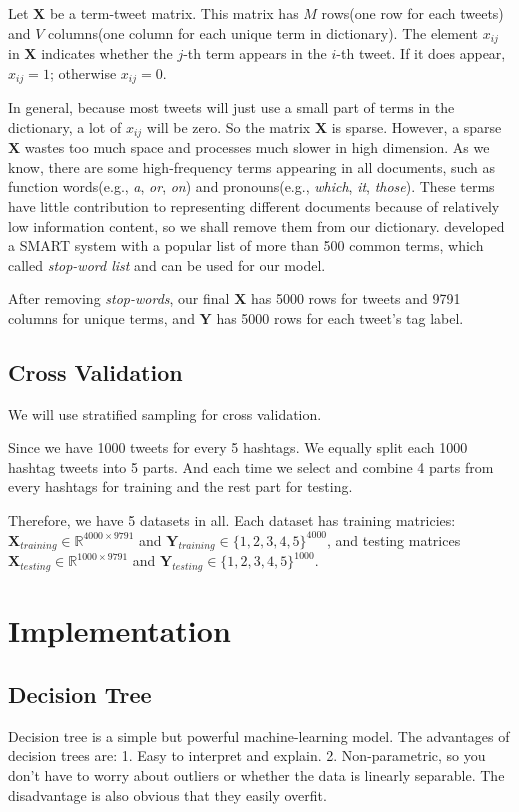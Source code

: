 \documentclass[letterpaper,11pt,twocolumn]{article}
\def\bfY{\mathbf Y}
\def\bfX{\mathbf X}
\def\R{\mathbb R}
\begin{document}
Let $\bfX$ be a term-tweet matrix. This matrix has $M$ rows(one row for each tweets) and $V$ columns(one column for each unique term in dictionary). The element $x_{ij}$ in $\bfX$ indicates whether the $j$-th term appears in the $i$-th tweet. If it does appear, $x_{ij} = 1$; otherwise $x_{ij} = 0$.

In general, because most tweets will just use a small part of terms in the dictionary, a lot of $x_{ij}$ will be zero. So the matrix $\bfX$ is sparse. However, a sparse $\bfX$ wastes too much space and processes much slower in high dimension. As we know, there are some high-frequency terms appearing in all documents, such as function words(e.g., \emph{a}, \emph{or}, \emph{on}) and pronouns(e.g., \emph{which}, \emph{it}, \emph{those}). These terms have little contribution to representing different documents because of relatively low information content, so we shall remove them from our dictionary. \cite{salton1971smart} developed a SMART system with a popular list of more than 500 common terms, which called \emph{stop-word list} and can be used for our model.

After removing \emph{stop-words}, our final $\bfX$ has 5000 rows for tweets and 9791 columns for unique terms, and $\bfY$ has 5000 rows for each tweet's tag label.
\subsection{Cross Validation}
We will use stratified sampling for cross validation.

Since we have 1000 tweets for every 5 hashtags. We equally split each 1000 hashtag tweets into 5 parts. And each time we select and combine 4 parts from every hashtags for training and the rest part for testing.

Therefore, we have 5 datasets in all. Each dataset has training matricies: $\bfX_{training} \in \R^{4000 \times 9791}$ and $\bfY_{training} \in \{1, 2, 3, 4, 5\}^{4000}$, and testing matrices $\bfX_{testing} \in \R^{1000 \times 9791}$ and $\bfY_{testing} \in \{1, 2, 3, 4, 5\}^{1000}$.

\section{Implementation}
\label{sec:impl}
\subsection{Decision Tree}
Decision tree is a simple but powerful machine-learning model. The advantages of decision trees are: 1. Easy to interpret and explain. 2. Non-parametric, so you don't have to worry about outliers or whether the data is linearly separable. The disadvantage is also obvious that they easily overfit.
\end{document}
